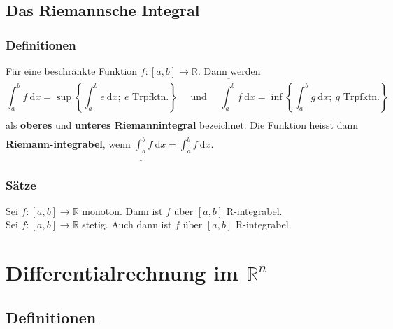 \documentclass[a4paper,10pt]{scrartcl}
\newcommand{\diff}{\ \mathrm{d}}
\begin{document}
\subsection{Das Riemannsche Integral}
\subsubsection{Definitionen}
Für eine beschränkte Funktion $f:[a,b]\to \mathbb{R}$. Dann werden 
\begin{equation}
	\underline{\int_{a}^{b}} f\diff x = \sup \left\{ \int_{a}^{b} e \diff x;\ e \text{ Trpfktn.} \right\}\quad \text{ und }\quad
	\overline{\int_{a}^{b}} f\diff x = \inf \left\{ \int_{a}^{b} g \diff x;\ g \text{ Trpfktn.} \right\}
\end{equation} 
als \textbf{oberes} und \textbf{unteres Riemannintegral} bezeichnet. Die Funktion heisst dann \textbf{Riemann-integrabel}, wenn $\underline{\int_{a}^{b} }f\diff x = \overline{\int_{a}^{b}} f\diff x$.
\subsubsection{Sätze}
Sei $f:[a,b]\to \mathbb{R}$ monoton. Dann ist $f$ über $[a,b]$ R-integrabel. \\
Sei $f:[a,b]\to \mathbb{R}$ stetig. Auch dann ist $f$ über $[a,b]$ R-integrabel.\\
\section{Differentialrechnung im $\mathbb{R}^n$}
\subsection{Definitionen}
\end{document}
